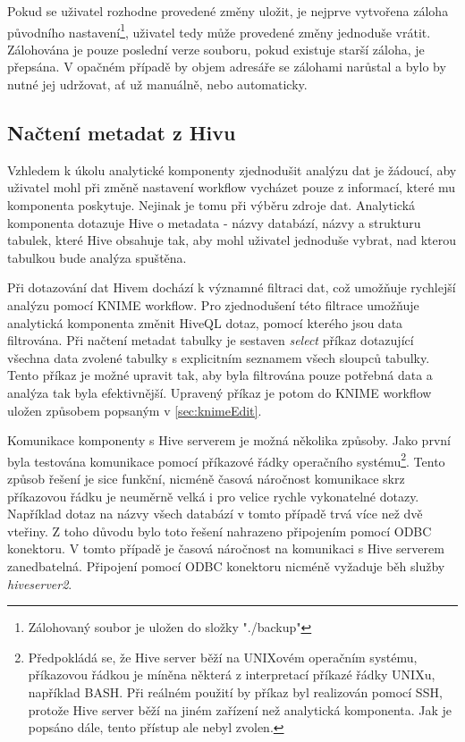 \documentclass[11pt,twoside,a4paper]{book}
\begin{document}
		Pokud se uživatel rozhodne provedené změny uložit, je nejprve vytvořena záloha původního nastavení\footnote{Zálohovaný soubor je uložen do složky "./backup"}, uživatel tedy může provedené změny jednoduše vrátit. Zálohována je pouze poslední verze souboru, pokud existuje starší záloha, je přepsána. V opačném případě by objem adresáře se zálohami narůstal a bylo by nutné jej udržovat, ať už manuálně, nebo automaticky.  

		\subsection{Načtení metadat z Hivu}
		Vzhledem k úkolu analytické komponenty zjednodušit analýzu dat je žádoucí, aby uživatel mohl při změně nastavení workflow vycházet pouze z informací, které mu komponenta poskytuje. Nejinak je tomu při výběru zdroje dat. Analytická komponenta dotazuje Hive o metadata - názvy databází, názvy a strukturu tabulek, které Hive obsahuje tak, aby mohl uživatel jednoduše vybrat, nad kterou tabulkou bude analýza spuštěna. 

		Při dotazování dat Hivem dochází k významné filtraci dat, což umožňuje rychlejší analýzu pomocí KNIME workflow. Pro zjednodušení této filtrace umožňuje analytická komponenta změnit HiveQL dotaz, pomocí kterého jsou data filtrována. Při načtení metadat tabulky je sestaven \textit{select} příkaz dotazující všechna data zvolené tabulky s explicitním seznamem všech sloupců tabulky. Tento příkaz je možné upravit tak, aby byla filtrována pouze potřebná data a analýza tak byla efektivnější. Upravený příkaz je potom do KNIME workflow uložen způsobem popsaným v \ref{sec:knimeEdit}.

		Komunikace komponenty s Hive serverem je možná několika způsoby. Jako první byla testována komunikace pomocí příkazové řádky operačního systému\footnote{Předpokládá se, že Hive server běží na UNIXovém operačním systému, příkazovou řádkou je míněna některá z interpretací příkazé řádky UNIXu, například BASH. Při reálném použití by příkaz byl realizován pomocí SSH, protože Hive server běží na jiném zařízení než analytická komponenta. Jak je popsáno dále, tento přístup ale nebyl zvolen.}. Tento způsob řešení je sice funkční, nicméně časová náročnost komunikace skrz příkazovou řádku je neuměrně velká i pro velice rychle vykonatelné dotazy. Například dotaz na názvy všech databází v tomto případě trvá více než dvě vteřiny.  Z toho důvodu bylo toto řešení nahrazeno připojením pomocí ODBC konektoru. V tomto případě je časová náročnost na komunikaci s Hive serverem zanedbatelná. Připojení pomocí ODBC konektoru nicméně vyžaduje běh služby \textit{hiveserver2}.
\end{document}

